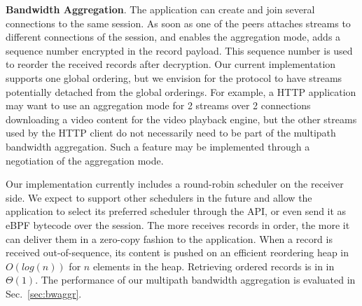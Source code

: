 \textbf{Bandwidth Aggregation}.
The application can create and join several \tcp connections to
the same \tcpls session. As soon as one of the peers attaches streams to
different \tcp connections of the session, and enables the aggregation mode,
\tcpls adds a sequence number encrypted in the \tls record payload. This
sequence number is used to reorder the received records after decryption. 
Our
current implementation supports one global ordering, but
we envision for the \tcpls protocol to have streams potentially detached from
the global orderings. For example, a HTTP application may want to use an
aggregation mode for 2 streams over 2 \tcp connections downloading a video
content for the video playback engine, but the other streams used by the HTTP
client do not necessarily need to be part of the multipath bandwidth aggregation.
Such a feature may be implemented through a negotiation of the aggregation
mode.

Our implementation currently includes a round-robin scheduler on the receiver
side. We expect to
support other schedulers in the future and allow the application to select its 
preferred scheduler through the API, or even send it as eBPF bytecode over the 
session. The more \tcpls receives records in order, the more it can deliver 
them in a zero-copy fashion to the application. When a record is received 
out-of-sequence, its content is pushed on an efficient reordering heap in 
$O(log(n))$ for $n$ elements in the heap. Retrieving ordered records is in
in $\Theta(1)$. The performance of our multipath bandwidth aggregation is evaluated 
in Sec.~\ref{sec:bwaggr}.


